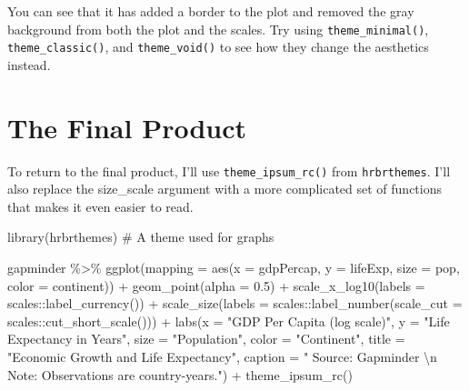 \documentclass[
  letterpaper,
]{book}
\newenvironment{Shaded}{\begin{snugshade}}{\end{snugshade}}
\newcommand{\AttributeTok}[1]{\textcolor[rgb]{0.40,0.45,0.13}{#1}}
\newcommand{\CommentTok}[1]{\textcolor[rgb]{0.37,0.37,0.37}{#1}}
\newcommand{\FloatTok}[1]{\textcolor[rgb]{0.68,0.00,0.00}{#1}}
\newcommand{\FunctionTok}[1]{\textcolor[rgb]{0.28,0.35,0.67}{#1}}
\newcommand{\NormalTok}[1]{\textcolor[rgb]{0.00,0.23,0.31}{#1}}
\newcommand{\SpecialCharTok}[1]{\textcolor[rgb]{0.37,0.37,0.37}{#1}}
\newcommand{\StringTok}[1]{\textcolor[rgb]{0.13,0.47,0.30}{#1}}
\begin{document}
You can see that it has added a border to the plot and removed the gray
background from both the plot and the scales. Try using
\texttt{theme\_minimal()}, \texttt{theme\_classic()}, and
\texttt{theme\_void()} to see how they change the aesthetics instead.

\hypertarget{the-final-product}{%
\section{The Final Product}\label{the-final-product}}

To return to the final product, I'll use \texttt{theme\_ipsum\_rc()}
from \texttt{hrbrthemes}. I'll also replace the size\_scale argument
with a more complicated set of functions that makes it even easier to
read.

\begin{Shaded}
\begin{Highlighting}[]
\FunctionTok{library}\NormalTok{(hrbrthemes) }\CommentTok{\# A theme used for graphs}

\NormalTok{gapminder }\SpecialCharTok{\%\textgreater{}\%}
  \FunctionTok{ggplot}\NormalTok{(}\AttributeTok{mapping =} \FunctionTok{aes}\NormalTok{(}\AttributeTok{x =}\NormalTok{ gdpPercap, }
                       \AttributeTok{y =}\NormalTok{ lifeExp,}
                       \AttributeTok{size =}\NormalTok{ pop,}
                       \AttributeTok{color =}\NormalTok{ continent)) }\SpecialCharTok{+}
  \FunctionTok{geom\_point}\NormalTok{(}\AttributeTok{alpha =} \FloatTok{0.5}\NormalTok{) }\SpecialCharTok{+} 
  \FunctionTok{scale\_x\_log10}\NormalTok{(}\AttributeTok{labels =}\NormalTok{ scales}\SpecialCharTok{::}\FunctionTok{label\_currency}\NormalTok{()) }\SpecialCharTok{+}
  \FunctionTok{scale\_size}\NormalTok{(}\AttributeTok{labels =}\NormalTok{ scales}\SpecialCharTok{::}\FunctionTok{label\_number}\NormalTok{(}\AttributeTok{scale\_cut =}\NormalTok{ scales}\SpecialCharTok{::}\FunctionTok{cut\_short\_scale}\NormalTok{())) }\SpecialCharTok{+}
  \FunctionTok{labs}\NormalTok{(}\AttributeTok{x =} \StringTok{"GDP Per Capita (log scale)"}\NormalTok{,}
       \AttributeTok{y =} \StringTok{"Life Expectancy in Years"}\NormalTok{,}
       \AttributeTok{size =} \StringTok{"Population"}\NormalTok{,}
       \AttributeTok{color =} \StringTok{"Continent"}\NormalTok{,}
       \AttributeTok{title =} \StringTok{"Economic Growth and Life Expectancy"}\NormalTok{,}
       \AttributeTok{caption =} \StringTok{" Source: Gapminder }\SpecialCharTok{\textbackslash{}n}\StringTok{ Note: Observations are country{-}years."}\NormalTok{) }\SpecialCharTok{+}
  \FunctionTok{theme\_ipsum\_rc}\NormalTok{()}
\end{Highlighting}
\end{Shaded}
\end{document}
